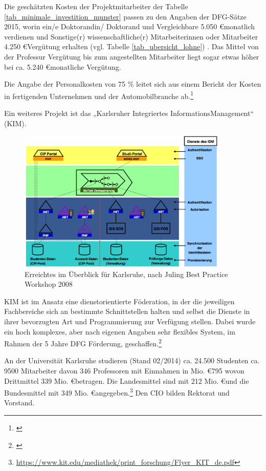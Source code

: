 Die geschätzten Kosten der Projektmitarbeiter der Tabelle \ref{tab_minimale_investition_munster} passen zu den Angaben der DFG-Sätze 2015, worin ein/e Doktorandin/ Doktorand und Vergleichbare 5.050 \euro monatlich verdienen und Sonstige(r) wissenschaftliche(r) Mitarbeiterinnen oder Mitarbeiter 4.250 \euro Vergütung erhalten (vgl. Tabelle \ref{tab_ubersicht_lohne}) . Das Mittel von der Professur Vergütung bis zum angestellten Mitarbeiter liegt sogar etwas höher bei ca. 5.240 \euro monatliche Vergütung.

Die Angabe der Personalkosten von 75 \%  leitet sich aus einem Bericht der Kosten in fertigenden Unternehmen und der Automobilbranche ab.\footnote{\cite{schuelein_2009}}

Ein weiteres Projekt ist das „Karlsruher Integriertes InformationsManagement“ (KIM).
\begin{figure}[h!]
	\centering
	\includegraphics[width=10cm]{kapitel/gruppe4_2/bilder/ubersicht_karlsruhe}
	\caption{Erreichtes im Überblick für Karlsruhe, nach Juling Best Practice Workshop 2008}
	\label{fig_ubersicht_karlsruhe}
\end{figure}

KIM ist im Ansatz eine dienstorientierte Föderation, in der die jeweiligen Fachbereiche sich an bestimmte Schnittstellen halten und selbst die Dienste in ihrer bevorzugten Art und Programmierung zur Verfügung stellen. Dabei wurde ein hoch komplexes, aber nach eigenen Angaben sehr flexibles System, im Rahmen der 5 Jahre DFG Förderung, geschaffen.\footnote{\cite{bode_informationsmanagement_2010}}

An der Universität Karlsruhe studieren (Stand 02/2014) ca. 24.500 Studenten ca. 9500 Mitarbeiter davon 346 Professoren mit Einnahmen in Mio. \euro 795 wovon Drittmittel 339 Mio. \euro betragen. Die Landesmittel sind mit 212 Mio. \euro und die Bundesmittel mit 349 Mio. \euro angegeben.\footnote{\url{https://www.kit.edu/mediathek/print_forschung/Flyer_KIT_de.pdf}} Den CIO bilden Rektorat und Vorstand.

